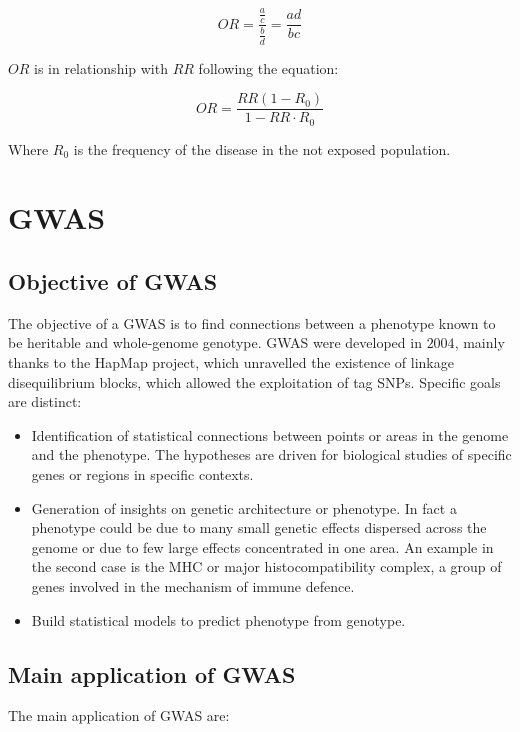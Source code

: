 		$$OR = \frac{\frac{a}{c}}{\frac{b}{d}} = \frac{ad}{bc}$$

		$OR$ is in relationship with $RR$ following the equation:

		$$OR = \frac{RR(1-R_0)}{1-RR\cdot R_0}$$

		Where $R_0$ is the frequency of the disease in the not exposed population.

\section{GWAS}

	\subsection{Objective of GWAS}
	The objective of a GWAS is to find connections between a phenotype known to be heritable and whole-genome genotype.
	GWAS were developed in $2004$, mainly thanks to the HapMap project, which unravelled the existence of linkage disequilibrium blocks, which allowed the exploitation of tag SNPs.
	Specific goals are distinct:

	\begin{multicols}{2}
		\begin{itemize}
			\item Identification of statistical connections between points or areas in the genome and the phenotype.
				The hypotheses are driven for biological studies of specific genes or regions in specific contexts.
			\item Generation of insights on genetic architecture or phenotype.
				In fact a phenotype could be due to many small genetic effects dispersed across the genome or due to few large effects concentrated in one area.
				An example in the second case is the MHC or major histocompatibility complex, a group of genes involved in the mechanism of immune defence.
			\item Build statistical models to predict phenotype from genotype.
		\end{itemize}
	\end{multicols}

	\subsection{Main application of GWAS}
	The main application of GWAS are:

